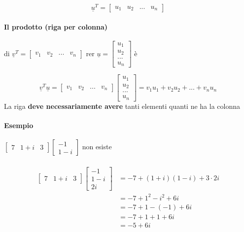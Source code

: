 $$
\underline{u}^T=
\begin{bmatrix}
    u_1 & u_2 & ... & u_n
\end{bmatrix}
$$

\paragraph{Il prodotto (riga per colonna)} di $\underline{v}^T=
\begin{bmatrix}
    v_1 & v_2& ... & v_n
\end{bmatrix}$
rer 
$
\underline{u}=
\begin{bmatrix}
    u_1\\u_2\\...\\u_n
\end{bmatrix}
$ è 

$$\underline{v}^T\underline{u}=
\begin{bmatrix}
    v_1 & v_2 & ... & v_n
\end{bmatrix}
\begin{bmatrix}
    u_1\\u_2\\...\\u_n
\end{bmatrix}
=v_1u_1+v_2u_2+...+v_nu_n
$$
{\color{red}
La riga \textbf{deve necessariamente avere} tanti elementi quanti ne ha la colonna
}

\paragraph{Esempio}
$
\begin{bmatrix}
    7 & 1+i & 3
\end{bmatrix}
\begin{bmatrix}
    -1 \\1-i
\end{bmatrix}
$ non esiste\\\\
\begin{align*}
    \begin{bmatrix}
        7 & 1+i & 3
    \end{bmatrix}
    \begin{bmatrix}
        -1 \\1-i \\ 2i
    \end{bmatrix}
& = -7+(1+i)(1-i)+3\cdot 2i\\
& = -7+1^2-i^2+6i\\
& = -7+1-(-1)+6i\\
& = -7+1+1+6i\\
& = -5+6i
\end{align*}
